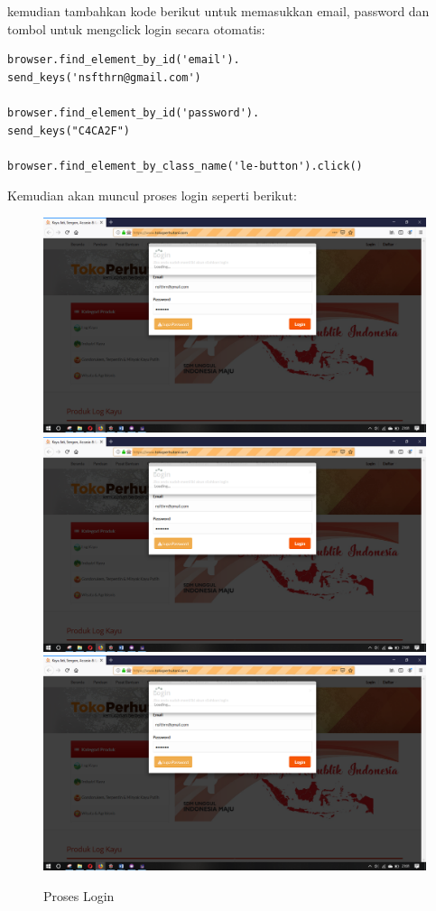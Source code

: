 kemudian tambahkan kode berikut untuk memasukkan email, password dan tombol untuk mengclick login secara otomatis: 
\begin{verbatim}
browser.find_element_by_id('email').
send_keys('nsfthrn@gmail.com')

browser.find_element_by_id('password').
send_keys("C4CA2F")

browser.find_element_by_class_name('le-button').click() 
\end{verbatim}
\newpage
Kemudian akan muncul proses login seperti berikut:
\begin{figure}[h]
	\centering
	\includegraphics[scale=0.21]{figures/1login}
	\includegraphics[scale=0.25]{figures/1login}
	\includegraphics[scale=0.21]{figures/1login}
	\caption{Proses Login}
\end{figure}

